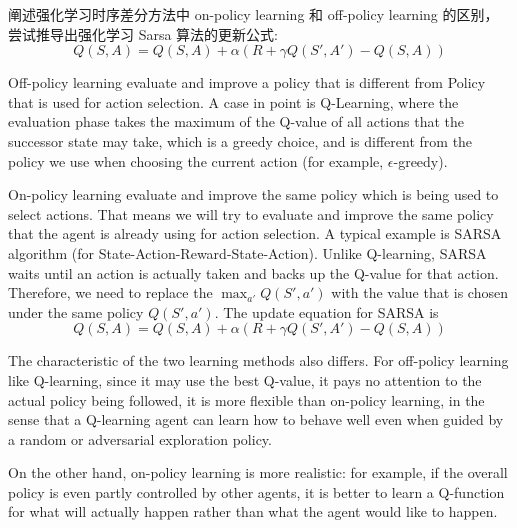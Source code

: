 \begin{exercise}[]{阐述强化学习时序差分方法中 on-policy learning 和 off-policy learning 的区别，尝试推导出强化学习 Sarsa 算法的更新公式:
    \begin{equation}
        Q(S,A) = Q(S,A) + \alpha(R + \gamma Q(S',A') - Q(S,A))
    \end{equation}}
  \begin{solution}
    Off-policy learning evaluate and improve a policy that is different from Policy that is used for action selection. A case in point is Q-Learning, where the evaluation phase takes the maximum of the Q-value of all actions that the successor state may take, which is a greedy choice, and is different from the policy we use when choosing the current action (for example, $\epsilon$-greedy).


    On-policy learning evaluate and improve the same policy which is being used to select actions. That means we will try to evaluate and improve the same policy that the agent is already using for action selection. A typical example is SARSA algorithm (for State-Action-Reward-State-Action). Unlike Q-learning, SARSA waits until an action is actually taken and backs up the Q-value for that action. Therefore, we need to replace the $\max_{a'}Q(S',a')$ with the value that is chosen under the same policy $Q(S',a')$. The update equation for SARSA is
    \begin{equation}
        Q(S,A) = Q(S,A) + \alpha(R + \gamma Q(S',A') - Q(S,A))
    \end{equation}
    
    The characteristic of the two learning methods also differs. For off-policy learning like Q-learning, since it may use the best Q-value, it pays no attention to the actual policy being followed, it is more flexible than on-policy learning, in the sense that a Q-learning agent can learn how to behave well even when guided by a random or adversarial exploration policy. 
    
    On the other hand, on-policy learning is more realistic: for example, if the overall policy is even partly controlled by other agents, it is better to learn a Q-function for what will actually happen rather than what the agent would like to happen.
  \end{solution}
  \label{ex3}
\end{exercise}

